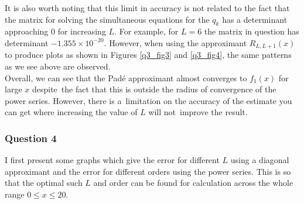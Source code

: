 \documentclass[12pt, a4paper]{article}
\begin{document}
It is also worth noting that this limit in accuracy is not related to the fact that the matrix
for solving the simultaneous equations for the $q_{k}$ has a determinant approaching 0 for
increasing $L$. For example, for $L = 6$ the matrix in question has determinant 
$-1.355\times 10^{-20}$. However, when using the approximant $R_{L,L+1}(x)$ to  
produce plots as shown in Figures \ref{q3_fig3} and \ref{q3_fig4}, the same patterns
as we see above are observed.
\\

Overall, we can see that the Pad\'e approximant almost converges to $f_{1}(x)$ for large $x$ despite\ 
the fact that this is outside the radius of convergence of the power series. However, there is a\ 
limitation on the accuracy of the estimate you can get where increasing the value of $L$ will not\ 
improve the result.


\subsubsection*{Question 4}

I first present some graphs which give the error for different $L$ using a diagonal approximant and
the error for different orders using the power series. This is so that the optimal such $L$ and order
can be found for calculation across the whole range $0 \leq x \leq 20$.
\end{document}
